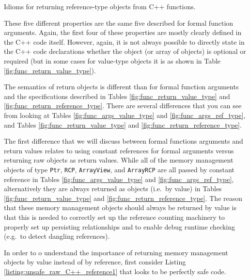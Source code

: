 \documentclass[pdf,ps2pdf,11pt]{SANDreport}
\begin{document}
\begin{table}[p]
%
\begin{center}
%
%

%
%
%
\end{center}
\caption{\label{fig:func_return_reference_type}
Idioms for returning reference-type objects from C++ functions.}
%
\end{table}


These five different properties are the same five described for formal
function arguments.  Again, the first four of these properties are
mostly clearly defined in the C++ code itself.  However, again, it is
not always possible to directly state in the C++ code declarations
whether the object (or array of objects) is optional or required (but
in some cases for value-type objects it is as shown in Table
{}\ref{fig:func_return_value_type}).

The semantics of return objects is different than for formal function
arguments and the specifications described in Tables
{}\ref{fig:func_return_value_type} and
{}\ref{fig:func_return_reference_type}.  There are several differences
that you can see from looking at Tables
{}\ref{fig:func_args_value_type} and {}\ref{fig:func_args_ref_type},
and Tables {}\ref{fig:func_return_value_type} and
{}\ref{fig:func_return_reference_type}.

The first difference that we will discuss between formal functions
arguments and return values relates to using constant references for
formal arguments versus returning raw objects as return values.  While
all of the memory management objects of type {}\texttt{Ptr},
{}\texttt{RCP}, {}\texttt{ArrayView}, and {}\texttt{ArrayRCP} are all
passed by constant reference in Tables
{}\ref{fig:func_args_value_type} and {}\ref{fig:func_args_ref_type},
alternatively they are always returned as objects (i.e.\ by value) in
Tables {}\ref{fig:func_return_value_type} and
{}\ref{fig:func_return_reference_type}.  The reason that these memory
management objects should always be returned by value is that this is
needed to correctly set up the reference counting machinery to
properly set up persisting relationships and to enable debug runtime
checking (e.g.\ to detect dangling references).

In order to o understand the importance of returning memory management
objects by value instead of by reference, first consider Listing
{}\ref{listing:unsafe_raw_C++_reference1} that looks to be perfectly
safe code.
\end{document}
